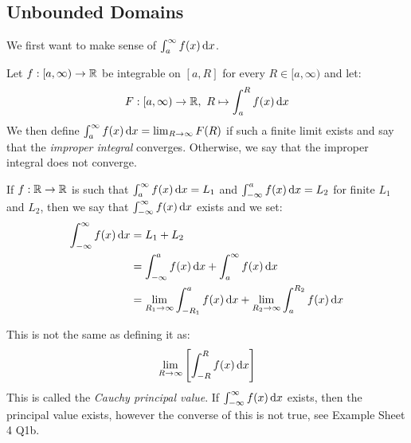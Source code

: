 \documentclass[../main.tex]{subfiles}
\begin{document}
\subsection{Unbounded Domains}
We first want to make sense of $\int_{a}^{\infty} f(x) \d{x}$.
\begin{definition}
  Let $f: [a, \infty) \to \mathbb{R}$ be integrable on $[a, R]$ for every $R \in [a, \infty)$ and let:
  \[
    F: [a, \infty) \to \R,\ R \mapsto \int_{a}^{R} f(x) \d{x}
  \]
  We then define $\int_{a}^{\infty} f(x) \d{x} = \lim_{R \to \infty} F(R)$ if such a finite limit exists and say that the \textit{improper integral} converges.
  Otherwise, we say that the improper integral does not converge.
\end{definition}
\begin{definition}
  If $f: \mathbb{R} \to \mathbb{R}$ is such that $\int_{a}^{\infty} f(x) \d{x} = L_1$ and $\int_{-\infty}^{a} f(x) \d{x} = L_2$ for finite $L_1$ and $L_2$, then we say that $\int_{-\infty}^{\infty} f(x) \d{x}$ exists and we set:
  \begin{align*}
    \int_{-\infty}^{\infty} f(x) \d{x} &= L_1 + L_2 \\
                                       &= \int_{-\infty}^{a} f(x) \d{x} + \int_{a}^{\infty} f(x) \d{x} \\
                                       &= \lim_{R_1 \to \infty} \int_{-R_1}^{a} f(x) \d{x} + \lim_{R_2 \to \infty} \int_{a}^{R_2} f(x) \d{x}
  \end{align*}
\end{definition}
\begin{remark}
  This is not the same as defining it as: \label{PVDomain}
  \[
    \lim_{R \to \infty} \left[\int_{-R}^{R} f(x) \d{x}\right]
  \]
  This is called the \textit{Cauchy principal value}.
  If $\int_{-\infty}^{\infty} f(x) \d{x}$ exists, then the principal value exists, however the converse of this is not true, see Example Sheet 4 Q1b.
\end{remark}
\end{document}
